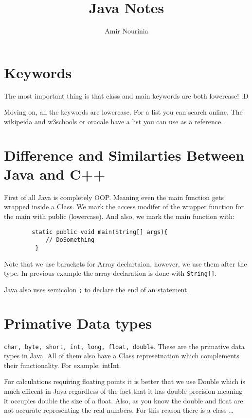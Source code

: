 \documentclass[11pt,twoside,a4paper]{report}
\title{Java Notes}
\author{Amir Nourinia}
\begin{document}
    \maketitle
    \section{Keywords}
    The most important thing is that class and main keywords are both lowercase! :D

    Moving on, all the keywords are lowercase. For a list you can search online. The wikipeida and w3schools or oracale have a list you can use as a reference.
    \section{Difference and Similarties Between Java and C++}
        First of all Java is completely OOP. Meaning even the main function gets wrapped inside a Class.
        We mark the access modifer of the wrapper function for the main with public (lowercase). And also, we mark
        the main function with:
        
        \begin{lstlisting}
        static public void main(String[] args){
            // DoSomething
         }
        \end{lstlisting}

        Note that we use barackets for Array declartaion, however, we use them after the type. In previous example the array declaration is done 
        with \verb|String[]|.

        Java also uses semicolon \verb|;| to declare the end of an statement.

    \section{Primative Data types}
        \verb|char, byte, short, int, long, float, double|. These are the primative data types in Java. All of them also have a Class represetnation
        which complements their functionality. For example: int\textrightarrow Int.

        For calculations requiring floating points it is better that we use Double which is much efficent in Java regardless of the fact that it has double precision meaning it occupies double the size
        of a float. Also, as you know the double and float are not accurate representing the real numbers. For this reason there is a class \dots
\end{document}
